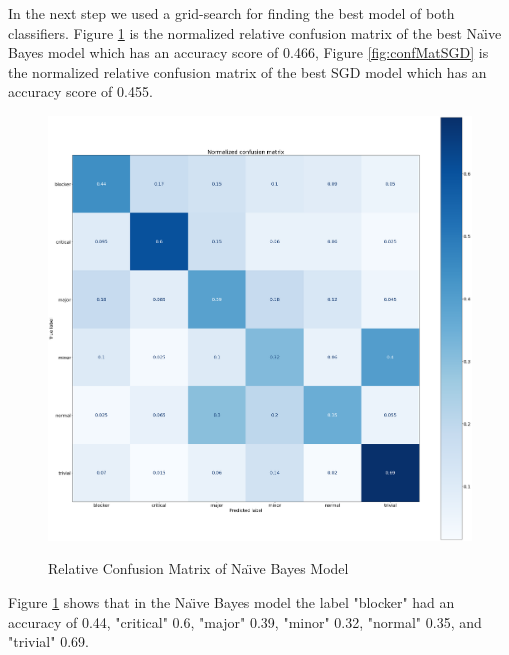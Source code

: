 \documentclass[sigconf,screen]{acmart}
\begin{document}
In the next step we used a grid-search for finding the best model of both classifiers. Figure \ref{fig:confMatNB} is the normalized relative confusion matrix of the best Na{\"\i}ve Bayes model which has an accuracy score of 0.466,  Figure \ref{fig:confMatSGD} is the normalized relative confusion matrix of the best SGD model which has an accuracy score of 0.455.

\begin{figure}[h]
	\caption{Relative Confusion Matrix of Na{\"\i}ve Bayes Model}
	\centering
	\includegraphics[scale=0.1]{norm_conf_matrix_nb}
	\label{fig:confMatNB}	
\end{figure}

Figure \ref{fig:confMatNB} shows that in the Na{\"\i}ve Bayes model the label "blocker" had an accuracy of 0.44, "critical"  0.6, "major" 0.39, "minor" 0.32, "normal" 0.35, and "trivial" 0.69.
\end{document}
